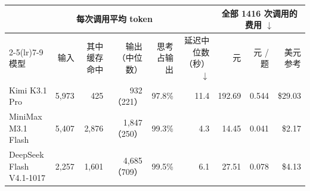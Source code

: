 \begin{tabular}{lrrrrrrrr}
\toprule
 & \multicolumn{4}{c}{每次调用平均 token} & & \multicolumn{3}{c}{全部 1416 次调用的费用 $\downarrow$} \\
\cmidrule(lr){2-5}\cmidrule(lr){7-9}
模型 & 输入 & 其中缓存命中 & 输出（中位数） & 思考占输出 & 延迟中位数（秒）$\downarrow$ & 元 & 元 / 题 & 美元参考 \\
\midrule
Kimi K3.1 Pro & 5,973 & 425 & 932（221） & 97.8\% & 11.4 & 192.69 & 0.544 & \$29.03 \\
MiniMax M3.1 Flash & 5,407 & 2,876 & 1,847（250） & 99.3\% & 4.3 & 14.45 & 0.041 & \$2.17 \\
DeepSeek Flash V4.1-1017 & 2,257 & 1,601 & 4,685（709） & 99.5\% & 6.1 & 27.51 & 0.078 & \$4.13 \\
\bottomrule
\end{tabular}
